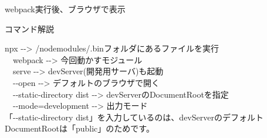 \def\startercodeblockfontsize{}
\begin{starterterminal}[]{webpack実行後、ブラウザで表示}\end{starterterminal}
\begin{starternote}[]{コマンド解説}

npx {-}{-}\textgreater{} /node\textunderscore{}modules/.binフォルダにあるファイルを実行\\[0pt]
　webpack {-}{-}\textgreater{} 今回動かすモジュール\\[0pt]
　serve {-}{-}\textgreater{} devServer(開発用サーバ)も起動\\[0pt]
　{-}{-}open {-}{-}\textgreater{} デフォルトのブラウザで開く\\[0pt]
　{-}{-}static{-}directory dist {-}{-}\textgreater{} devServerのDocumentRootを指定\\[0pt]
　{-}{-}mode=development {-}{-}\textgreater{} 出力モード\\[0pt]

「{-}{-}static{-}directory dist」を入力しているのは、devServerのデフォルトDocumentRootは「public」のためです。

\end{starternote}
\def\startercodeblockfontsize{}
